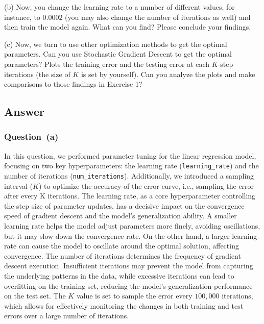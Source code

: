 \documentclass[a4paper, utf8]{ctexart}
\begin{document}
	\vspace{.5em}
	
	(b) Now, you change the learning rate to a number of different values, for instance, to $0.0002$ (you may also change the number of iterations as well) and then train the model again. What can you find? Please conclude your findings.
	
	\vspace{.5em}
	
	(c) Now, we turn to use other optimization methods to get the optimal parameters. Can you use Stochastic Gradient Descent to get the optimal parameters? Plots the training error and the testing error at each $K$-step iterations (the size of $K$ is set by yourself). Can you analyze the plots and make comparisons to those findings in Exercise 1?
	
	\subsection{Answer}
	
	\subsubsection{Question\ (a)}
	
	In this question, we performed parameter tuning for the linear regression model, focusing on two key hyperparameters: the learning rate (\verb|learning_rate|) and the number of iterations (\verb|num_iterations|). Additionally, we introduced a sampling interval ($K$) to optimize the accuracy of the error curve, i.e., sampling the error after every K iterations. The learning rate, as a core hyperparameter controlling the step size of parameter updates, has a decisive impact on the convergence speed of gradient descent and the model's generalization ability. A smaller learning rate helps the model adjust parameters more finely, avoiding oscillations, but it may slow down the convergence rate. On the other hand, a larger learning rate can cause the model to oscillate around the optimal solution, affecting convergence. The number of iterations determines the frequency of gradient descent execution. Insufficient iterations may prevent the model from capturing the underlying patterns in the data, while excessive iterations can lead to overfitting on the training set, reducing the model's generalization performance on the test set. The $K$ value is set to sample the error every $100,000$ iterations, which allows for effectively monitoring the changes in both training and test errors over a large number of iterations.
	
\end{document}
